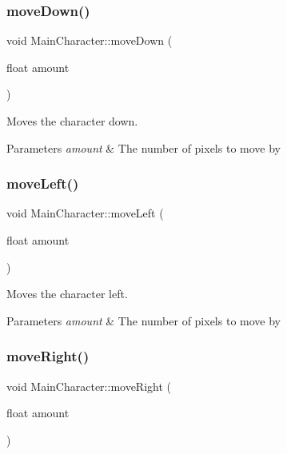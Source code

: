 \subsubsection{\texorpdfstring{moveDown()}{moveDown()}}
{\footnotesize\ttfamily void Main\+Character\+::move\+Down (\begin{DoxyParamCaption}\item[{float}]{amount }\end{DoxyParamCaption})}



Moves the character down. 


\begin{DoxyParams}{Parameters}
{\em amount} & The number of pixels to move by \\
\hline
\end{DoxyParams}
\mbox{\label{classMainCharacter_a88f2dac41fa25fb1f4711df6f81ee7c7}} 
\subsubsection{\texorpdfstring{moveLeft()}{moveLeft()}}
{\footnotesize\ttfamily void Main\+Character\+::move\+Left (\begin{DoxyParamCaption}\item[{float}]{amount }\end{DoxyParamCaption})}



Moves the character left. 


\begin{DoxyParams}{Parameters}
{\em amount} & The number of pixels to move by \\
\hline
\end{DoxyParams}
\mbox{\label{classMainCharacter_ab5a4b64dcc249e3208282797e523d813}} 
\subsubsection{\texorpdfstring{moveRight()}{moveRight()}}
{\footnotesize\ttfamily void Main\+Character\+::move\+Right (\begin{DoxyParamCaption}\item[{float}]{amount }\end{DoxyParamCaption})}




